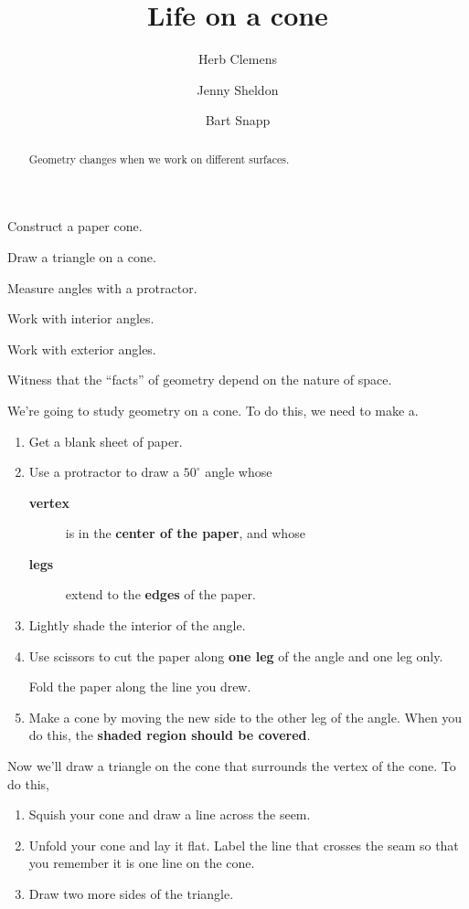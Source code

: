 \documentclass[nooutcomes,noauthor,handout]{../ximera}
\title{Life on a cone}
\author{Herb Clemens \and Jenny Sheldon \and Bart Snapp}
\begin{document}
\begin{abstract}
  Geometry changes when we work on different surfaces.
\end{abstract}
\maketitle


\begin{listOutcomes}
\item Construct a paper cone.
\item Draw a triangle on a cone.
\item Measure angles with a protractor.
\item Work with interior angles.
\item Work with exterior angles.
\item Witness that the ``facts'' of geometry depend on the nature of
  space.
\end{listOutcomes}

We're going to study geometry on a cone. To do this, we need to
make a.

\begin{enumerate}
\item Get a blank sheet of paper.
\item Use a protractor to draw a $50^\circ$ angle whose
  \begin{description}
    \item[\textbf{vertex}] is in the \textbf{center of the paper}, and whose
    \item[\textbf{legs}] extend to the \textbf{edges} of the paper.
  \end{description}
  \item {Lightly shade the interior of the angle.}
  \item {Use scissors to cut the paper along \textbf{one leg} of the
    angle and one leg only.} 
    
    Fold the paper along the line you drew.
  \item Make a cone by moving the new side to the other leg of the
    angle. When you do this, the \textbf{shaded region should be covered}.
\end{enumerate}

Now we'll draw a triangle on the cone that surrounds the vertex of the
cone. To do this,
\begin{enumerate}
\item Squish your cone and draw a line across the seem.
\item Unfold your cone and lay it flat. Label the line that crosses the seam so that you remember it is one line on the cone. 
\item Draw two more sides of the triangle.
\end{enumerate}
\end{document}
